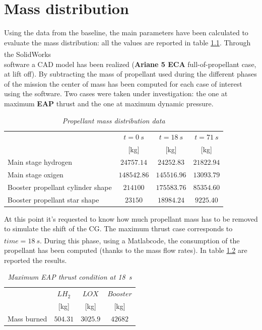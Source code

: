 \documentclass[12pt,fleqn,openany]{book} %
\begin{document}
\chapter{Mass distribution}\label{chap:mass}
Using the data from the baseline, the main parameters have been calculated to evaluate the mass distribution: all the values are reported in table \hypertarget{tab:mdata}{\ref{tab:mdata}}. Through the SolidWorks\textsuperscript\textregistered \\software a CAD model has been realized (\textbf{Ariane 5 ECA} full-of-propellant case, at lift off). By subtracting the mass of propellant used during the different phases of the mission the center of mass has been computed for each case of interest using the software. Two cases were taken under investigation: the one at maximum \textbf{EAP} thrust and the one at maximum dynamic pressure. 

\begin{table}[h]
	\centering
	\begin{tabular}{ l c c c}
\toprule
										&$t=\SI{0}{s}$ 			&$t = \SI{18}{s}$ 		&$t = \SI{71}{s}$	\\
										&[\si{\kilogram}]			&[\si{\kilogram}]			&[\si{\kilogram}]		\\
\midrule                                                                                                             
Main stage hydrogen 					&$24757.14$			&$24252.83$			&$21822.94 $		\\
Main stage oxigen 						&$148542.86$			&$145516.96$			&$13093.79$        \\
Booster propellant cylinder shape 		&$214100	   $		&	$175583.76$		&	$85354.60 $        \\
Booster propellant star shape 			&$23150	   $			&$18984.24 $			&$9225.40  $        \\
\bottomrule
\end{tabular} 
\caption{\emph{Propellant mass distribution data}}
\label{tab:mdata}
\end{table}
\noindent At this point it’s requested to know how much propellant mass has to be removed to simulate the shift of the CG. The maximum thrust case corresponds to $time = \SI{18}{s}$. During this phase, using a Matlab\textsuperscript\textregistered code, the consumption of the propellant has been computed (thanks to the mass flow rates). In table \hypertarget{tab:maxEAP}{\ref{tab:maxEAP}} are reported the results. 
\begin{table}[h]
	\centering
	\begin{tabular}{ l c c c}
\toprule
										&$LH_2$ 			&$LOX$ 				&$Booster$	\\
										&[\si{\kilogram}]			&[\si{\kilogram}]			&[\si{\kilogram}]		\\
\midrule                                                                                                             
Mass burned								&$504.31$			&$3025.9$			&$42682$			\\
\bottomrule
\end{tabular} 
\caption{\emph{Maximum EAP thrust condition at \SI{18}{s}}}        
\label{tab:maxEAP}                       
\end{table}                             
                      
\end{document}
